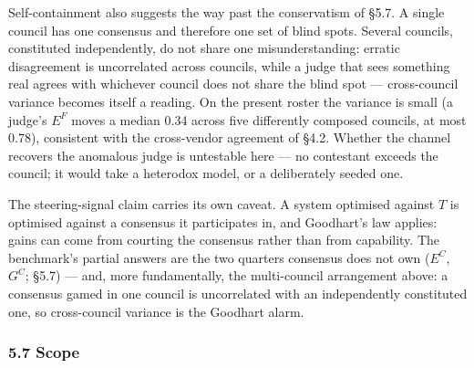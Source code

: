 Self-containment also suggests the way past the conservatism of §5.7. A single council has one consensus and therefore one set of blind spots. Several councils, constituted independently, do not share one misunderstanding: erratic disagreement is uncorrelated across councils, while a judge that sees something real agrees with whichever council does not share the blind spot --- cross-council variance becomes itself a reading. On the present roster the variance is small (a judge's \(E^{F}\) moves a median 0.34 across five differently composed councils, at most 0.78), consistent with the cross-vendor agreement of §4.2. Whether the channel recovers the anomalous judge is untestable here --- no contestant exceeds the council; it would take a heterodox model, or a deliberately seeded one.

The steering-signal claim carries its own caveat. A system optimised against \(T\) is optimised against a consensus it participates in, and Goodhart's law applies: gains can come from courting the consensus rather than from capability. The benchmark's partial answers are the two quarters consensus does not own (\(E^{C}\), \(G^{C}\); §5.7) --- and, more fundamentally, the multi-council arrangement above: a consensus gamed in one council is uncorrelated with an independently constituted one, so cross-council variance is the Goodhart alarm.

\subsubsection{5.7 Scope}\label{scope}

